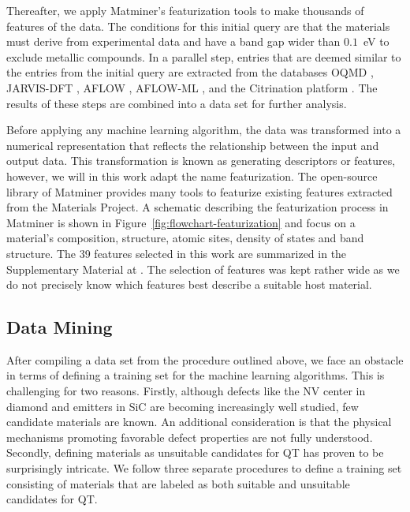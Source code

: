 \documentclass[superscriptaddress,unsortedaddress,
 amsmath,amssymb,
 aps,
]{revtex4-2}
\begin{document}




Thereafter, we apply Matminer’s \cite{Ward2018}
featurization tools to make thousands of features of the data. The conditions for this initial query are that the materials must derive from experimental data and have a band gap wider than $0.1$~eV to exclude metallic compounds. In a parallel step, entries that are deemed
similar to the entries from the initial query
are extracted from the databases OQMD \cite{Saal2013,Kirklin2015}, JARVIS-DFT \cite{Choudhary2020}, AFLOW \cite{Curtarolo2012, Curtarolo2012a, Calderon2015}, AFLOW-ML \cite{Isayev2017}, and the Citrination platform \cite{OMaraJordan2016MDIA}. The results of these steps are combined into a data set for further analysis. 

Before applying any machine learning algorithm, the data was transformed into a numerical representation that reflects the relationship between the input and output data. This transformation is known as generating descriptors
or features, however, we will in this work adapt the name featurization.
The open-source library of Matminer provides many tools to featurize existing features extracted from the Materials Project.
A schematic describing the  featurization process in Matminer is shown in Figure~\ref{fig:flowchart-featurization} 
and focus on a material's composition, structure, atomic sites, density of states and band structure. 
The 39 features selected in this work are summarized in the Supplementary Material at \cite{supplementary}. The selection of features was kept rather wide as we do not precisely know which features best describe a suitable  host material. 

\subsection*{Data Mining}

After compiling a data set from the procedure outlined above, we face an obstacle in terms of defining a training set for the machine learning algorithms. This is challenging for two reasons. 
Firstly, although defects like the NV center in diamond and emitters in SiC are becoming
increasingly well studied, few candidate materials are known. An additional consideration
is that the physical mechanisms promoting favorable defect properties are not fully understood. Secondly, defining materials as unsuitable candidates for QT has proven to be surprisingly intricate. 
We follow three separate procedures to define a training set consisting of materials that are labeled as both suitable and unsuitable candidates for QT. 
\end{document}
